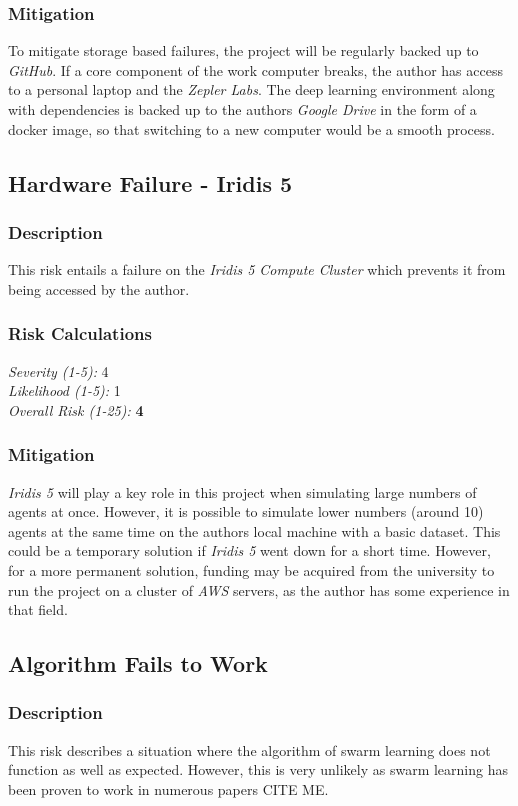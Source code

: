 \subsubsection{Mitigation}
To mitigate storage based failures, the project will be regularly backed up to \emph{GitHub}. If a core component of the work computer breaks, the author has access to a personal laptop and the \emph{Zepler Labs}. The deep learning environment along with dependencies is backed up to the authors \emph{Google Drive} in the form of a docker image, so that switching to a new computer would be a smooth process.

\subsection{Hardware Failure - Iridis 5}
\subsubsection{Description}
This risk entails a failure on the \emph{Iridis 5 Compute Cluster} which prevents it from being accessed by the author.

\subsubsection{Risk Calculations}
\emph{Severity (1-5):} 4 \\
\emph{Likelihood (1-5):} 1 \\
\emph{Overall Risk (1-25):} \textbf{4}

\subsubsection{Mitigation}
\emph{Iridis 5} will play a key role in this project when simulating large numbers of agents at once. However, it is possible to simulate lower numbers (around 10) agents at the same time on the authors local machine with a basic dataset. This could be a temporary solution if \emph{Iridis 5} went down for a short time. However, for a more permanent solution, funding may be acquired from the university to run the project on a cluster of \emph{AWS} servers, as the author has some experience in that field. 

\subsection{Algorithm Fails to Work}
\subsubsection{Description}
This risk describes a situation where the algorithm of swarm learning does not function as well as expected. However, this is very unlikely as swarm learning has been proven to work in numerous papers CITE ME.

